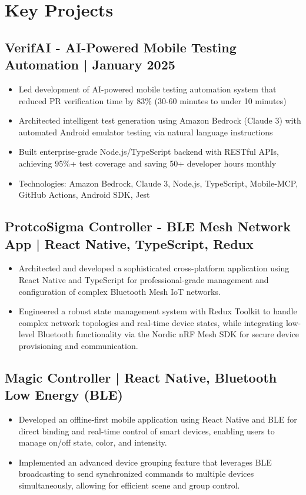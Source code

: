 \documentclass[11pt,a4paper]{article}
\begin{document}
\section{Key Projects}

\subsection{VerifAI - AI-Powered Mobile Testing Automation | January 2025}
\begin{itemize}
    \item Led development of AI-powered mobile testing automation system that reduced PR verification time by 83\% (30-60 minutes to under 10 minutes)
    \item Architected intelligent test generation using Amazon Bedrock (Claude 3) with automated Android emulator testing via natural language instructions
    \item Built enterprise-grade Node.js/TypeScript backend with RESTful APIs, achieving 95\%+ test coverage and saving 50+ developer hours monthly
    \item Technologies: Amazon Bedrock, Claude 3, Node.js, TypeScript, Mobile-MCP, GitHub Actions, Android SDK, Jest
\end{itemize}

\subsection{ProtcoSigma Controller - BLE Mesh Network App | React Native, TypeScript, Redux}
\begin{itemize}
    \item Architected and developed a sophisticated cross-platform application using React Native and TypeScript for professional-grade management and configuration of complex Bluetooth Mesh IoT networks.
    
    \item Engineered a robust state management system with Redux Toolkit to handle complex network topologies and real-time device states, while integrating low-level Bluetooth functionality via the Nordic nRF Mesh SDK for secure device provisioning and communication.
\end{itemize}


\subsection{Magic Controller | React Native, Bluetooth Low Energy (BLE)}
\begin{itemize}
    \item Developed an offline-first mobile application using React Native and BLE for direct binding and real-time control of smart devices, enabling users to manage on/off state, color, and intensity.
    
    \item Implemented an advanced device grouping feature that leverages BLE broadcasting to send synchronized commands to multiple devices simultaneously, allowing for efficient scene and group control.
\end{itemize}
\end{document}
